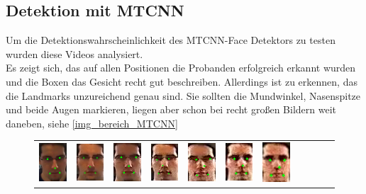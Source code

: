 \subsection{Detektion mit MTCNN}
Um die Detektionswahrscheinlichkeit des MTCNN-Face Detektors zu testen wurden diese Videos analysiert.\\
Es zeigt sich, das auf allen Positionen die Probanden erfolgreich erkannt wurden und die Boxen das Gesicht recht gut beschreiben. Allerdings ist zu erkennen, das die Landmarks unzureichend genau sind. Sie sollten die Mundwinkel, Nasenspitze und beide Augen markieren, liegen aber schon bei recht großen Bildern weit daneben, siehe \autoref{img_bereich_MTCNN}
\begin{figure}
	\centering
	\begin{tabular}{|c|c|c|c|c|c|c|c|c|c|c|}
		\hline
		\includegraphics[width=1.1cm]{img_MTCNN/Img1-4_pupil1}&
		\includegraphics[width=1.1cm]{img_MTCNN/Img2-4_pupil1}&
		\includegraphics[width=1.1cm]{img_MTCNN/Img3-4_pupil1}&
		\includegraphics[width=1.1cm]{img_MTCNN/Img4-4_pupil1}&
		\includegraphics[width=1.1cm]{img_MTCNN/Img5-4_pupil1}&
		\includegraphics[width=1.1cm]{img_MTCNN/Img6-4_pupil1}&
		\includegraphics[width=1.1cm]{img_MTCNN/Img7-4_pupil1}&

\end{tabular}
\end{figure}

